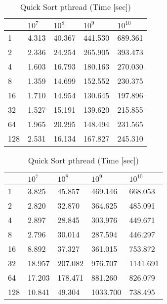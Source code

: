 \documentclass{article}
\begin{document}
\begin{table}[h!]
\begin{minipage}{0.48\textwidth}
\centering
\caption{Quick Sort omp (Time [sec])}
\label{my-label}
\begin{tabular}{l|llll}
&      $10^7$           &    $10^8$ & $10^9$    &  $10^{10}$    \\ \hline
1       &       4.313   &   40.367  & 441.530 & 689.361    \\ \hline
2       &       2.336   &   24.254  & 265.905& 393.473    \\ \hline
4       &       1.603   &   16.793  & 180.163 & 270.030    \\ \hline
8       & \cellcolor[HTML]{34FF34}      1.359   & \cellcolor[HTML]{34FF34}  14.699  & 152.552 & 230.375    \\ \hline
16      &       1.710   &   14.954  & \cellcolor[HTML]{34FF34}130.645 & \cellcolor[HTML]{34FF34}197.896    \\ \hline
32      &       1.527   &   15.191  & 139.620 & 215.855    \\ \hline
64      &       1.965   &   20.295  & 148.494 & 231.565    \\ \hline
128     &       2.531   &   16.134  & 167.827 & 245.310    \\ 
\end{tabular}
\end{minipage}%
\begin{minipage}{0.48\textwidth}
\centering
\caption{Quick Sort pthread (Time [sec])}
\label{my-label}
\begin{tabular}{l|llll}
&      $10^7$       &    $10^8$    & $10^9$      &  $10^{10}$  \\ \hline
1       &       3.825     &   45.857  & 469.146  &  668.053    \\ \hline
2       &       2.820     &   32.870  & 364.625  &  485.091    \\ \hline
4       &       2.897     &   28.845  & 303.976  &  449.671    \\ \hline
8       &  \cellcolor[HTML]{34FF34}     2.796     &  \cellcolor[HTML]{34FF34} 30.014  & \cellcolor[HTML]{34FF34} 287.594  & \cellcolor[HTML]{34FF34} 446.297    \\ \hline
16      &       8.892     &   37.327  & 361.015  &  753.872    \\ \hline
32      &       18.957    &   207.082 & 976.707  &  1141.691   \\ \hline
64      &       17.203    &   178.471 & 881.260  &  826.079    \\ \hline
128     &       10.841    &   49.304  & 1033.700 &  738.495    \\ 
\end{tabular}
\end{minipage}%
\end{table}
\end{document}
